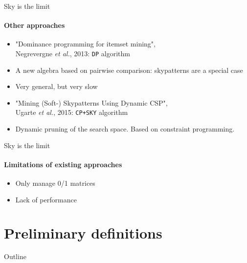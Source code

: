 \documentclass{beamer}
\newcommand{\etal}{\emph{et al.}}
\newcommand{\domp}{\texttt{DP}}
\newcommand{\cpsky}{\texttt{CP+SKY}}
\begin{document}
\begin{frame}{Sky is the limit}
  \framesubtitle{Other approaches}
  \begin{itemize}
  \item "Dominance programming for itemset mining", \\Negrevergne \etal{}, 2013: \domp{} algorithm
  \item A new algebra based on pairwise comparison: skypatterns are a special case
  \item Very general, but very slow
  \end{itemize}
  \begin{itemize}
  \pause
  \item "Mining (Soft-) Skypatterns Using Dynamic CSP", \\Ugarte \etal{}, 2015: \cpsky{} algorithm
  \item Dynamic pruning of the search space. Based on constraint programming.
  \end{itemize}
\end{frame}

\begin{frame}{Sky is the limit}
  \framesubtitle{Limitations of existing approaches}
  \begin{itemize}
  \item Only manage 0/1 matrices
  \item Lack of performance
  \end{itemize}
\end{frame}

\section{Preliminary definitions}
\begin{frame}{Outline}
  \tableofcontents[currentsection]
\end{frame}
\end{document}
